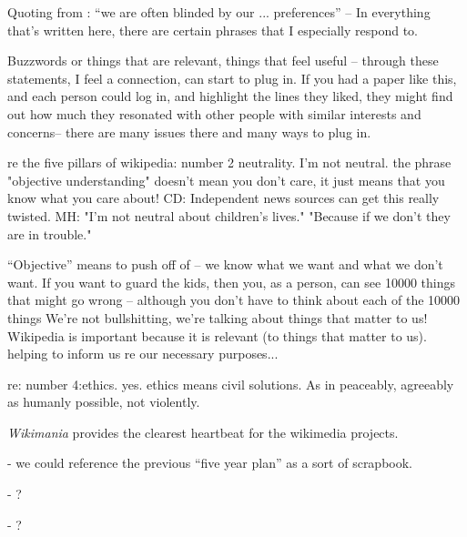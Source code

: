 Quoting from : ``we are often blinded by our ... preferences'' -- In everything that's written here, there are certain phrases that I especially respond to.

Buzzwords or things that are relevant, things that feel useful --
through these statements, I feel a connection, can start to plug in.
If you had a paper like this, and each person could log in, and
highlight the lines they liked, they might find out how much they
resonated with other people with similar interests and concerns--
there are many issues there and many ways to plug in.

re the five pillars of wikipedia: number 2 neutrality. I'm not
neutral. the phrase "objective understanding" doesn't mean you don't
care, it just means that you know what you care about!  CD:
Independent news sources can get this really twisted.  MH: "I'm not
neutral about children's lives."  "Because if we don't they are in
trouble."

``Objective'' means to push off of -- we know what we want and what
we don't want.  If you want to guard the kids, then you, as a person,
can see 10000 things that might go wrong -- although you don't have
to think about each of the 10000 things We're not bullshitting, we're
talking about things that matter to us!  Wikipedia is important
because it is relevant (to things that matter to us).  helping to
inform us re our necessary purposes...

re: number 4:ethics. yes. ethics means civil solutions. As in
peaceably, agreeably as humanly possible, not violently.
 
 \emph{Wikimania} provides the clearest
heartbeat for the wikimedia projects.

 - we could reference the previous ``five year
plan'' as a sort of scrapbook.

 - ?

 - ?

